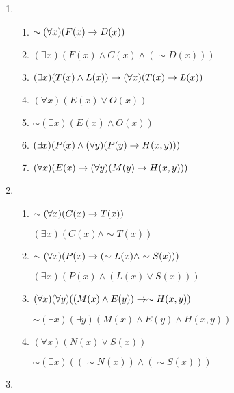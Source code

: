 \begin{enumerate}
  \item %
    \begin{enumerate}[label=(\alph*), align=left]
      \item \(\sim(\forall x)(F(x) \rightarrow D(x))\)
      \item \((\exists x)(F(x) \land C(x) \land (\sim D(x)))\)
      \item \((\exists x)(T(x) \land L(x)) \rightarrow (\forall x)(T(x) \rightarrow L(x))\)
      \item \((\forall x)(E(x) \lor O(x))\)
      \item \(\sim(\exists x)(E(x) \land O(x))\)
      \item \((\exists x)(P(x) \land (\forall y)(P(y) \rightarrow H(x, y)))\)
      \item \((\forall x)(E(x) \rightarrow (\forall y)(M(y) \rightarrow H(x, y)))\)
    \end{enumerate}

  \item %
    \begin{enumerate}
      \item \(\sim(\forall x)(C(x) \rightarrow T(x))\)

            \((\exists x)(C(x) \land \sim T(x))\)

      \item \(\sim(\forall x)(P(x) \rightarrow (\sim L(x) \land \sim S(x)))\)

            \((\exists x)(P(x) \land (L(x) \lor S(x)))\)

      \item \((\forall x)(\forall y)((M(x) \land E(y)) \rightarrow \sim H(x, y))\)

            \(\sim(\exists x)(\exists y)(M(x) \land E(y) \land H(x, y))\)

      \item \((\forall x)(N(x) \lor S(x))\)

            \(\sim (\exists x)((\sim N(x)) \land (\sim S(x)))\)
    \end{enumerate}

  \item %
\end{enumerate}
